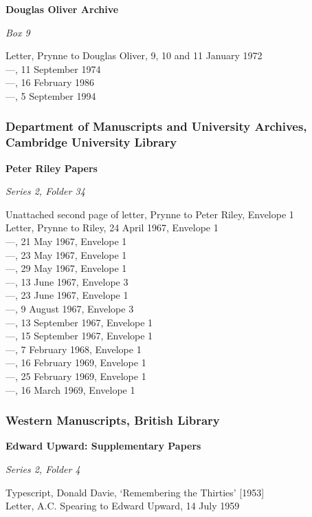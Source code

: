 \documentclass[]{article}
\begin{document}
\textbf{Douglas Oliver Archive}

\emph{Box 9}

Letter, Prynne to Douglas Oliver, 9, 10 and 11 January 1972\\
---, 11 September 1974\\
---, 16 February 1986\\
---, 5 September 1994

\subsubsection{Department of Manuscripts and University Archives,
Cambridge University
Library}\label{department-of-manuscripts-and-university-archives-cambridge-university-library}

\textbf{Peter Riley Papers}

\emph{Series 2, Folder 34}

Unattached second page of letter, Prynne to Peter Riley, Envelope 1\\
Letter, Prynne to Riley, 24 April 1967, Envelope 1\\
---, 21 May 1967, Envelope 1\\
---, 23 May 1967, Envelope 1\\
---, 29 May 1967, Envelope 1\\
---, 13 June 1967, Envelope 3\\
---, 23 June 1967, Envelope 1\\
---, 9 August 1967, Envelope 3\\
---, 13 September 1967, Envelope 1\\
---, 15 September 1967, Envelope 1\\
---, 7 February 1968, Envelope 1\\
---, 16 February 1969, Envelope 1\\
---, 25 February 1969, Envelope 1\\
---, 16 March 1969, Envelope 1

\subsubsection{Western Manuscripts, British
Library}\label{western-manuscripts-british-library}

\textbf{Edward Upward: Supplementary Papers}

\emph{Series 2, Folder 4}

Typescript, Donald Davie, `Remembering the Thirties' {[}1953{]}\\
Letter, A.C. Spearing to Edward Upward, 14 July 1959
\end{document}
